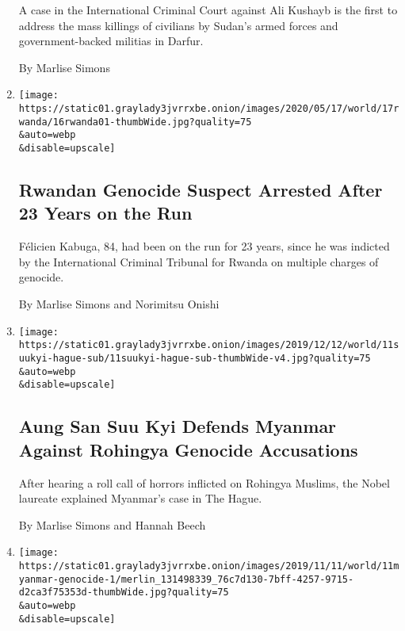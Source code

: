 \begin{enumerate}
  A case in the International Criminal Court against Ali Kushayb is the
  first to address the mass killings of civilians by Sudan's armed
  forces and government-backed militias in Darfur.

  By Marlise Simons
\item
  \href{/2020/05/16/world/europe/france-rwanda-genocide-kabuga.html}{}

  \texttt{[image: https://static01.graylady3jvrrxbe.onion/images/2020/05/17/world/17rwanda/16rwanda01-thumbWide.jpg?quality=75\\\&auto=webp\\\&disable=upscale]}

  \hypertarget{rwandan-genocide-suspect-arrested-after-23-years-on-the-run}{%
  \subsection{Rwandan Genocide Suspect Arrested After 23 Years on the
  Run}\label{rwandan-genocide-suspect-arrested-after-23-years-on-the-run}}

  Félicien Kabuga, 84, had been on the run for 23 years, since he was
  indicted by the International Criminal Tribunal for Rwanda on multiple
  charges of genocide.

  By Marlise Simons and Norimitsu Onishi
\item
  \href{/2019/12/11/world/asia/aung-san-suu-kyi-rohingya-myanmar-genocide-hague.html}{}

  \texttt{[image: https://static01.graylady3jvrrxbe.onion/images/2019/12/12/world/11suukyi-hague-sub/11suukyi-hague-sub-thumbWide-v4.jpg?quality=75\\\&auto=webp\\\&disable=upscale]}

  \hypertarget{aung-san-suu-kyi-defends-myanmar-against-rohingya-genocide-accusations}{%
  \subsection{Aung San Suu Kyi Defends Myanmar Against Rohingya Genocide
  Accusations}\label{aung-san-suu-kyi-defends-myanmar-against-rohingya-genocide-accusations}}

  After hearing a roll call of horrors inflicted on Rohingya Muslims,
  the Nobel laureate explained Myanmar's case in The Hague.

  By Marlise Simons and Hannah Beech
\item
  \href{/2019/11/11/world/asia/myanmar-rohingya-genocide.html}{}

  \texttt{[image: https://static01.graylady3jvrrxbe.onion/images/2019/11/11/world/11myanmar-genocide-1/merlin\_131498339\_76c7d130-7bff-4257-9715-d2ca3f75353d-thumbWide.jpg?quality=75\\\&auto=webp\\\&disable=upscale]}


\end{enumerate}
